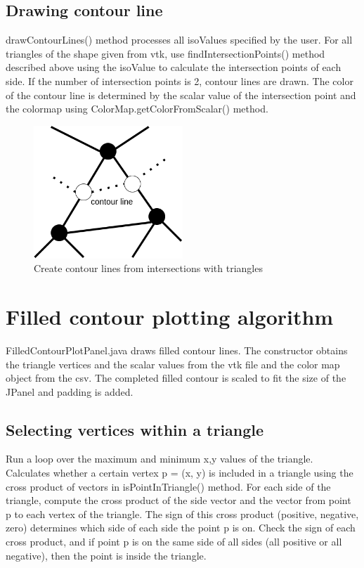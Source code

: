 \documentclass[12pt]{article}
\begin{document}
\subsection{Drawing contour line}
drawContourLines() method processes all isoValues specified by the user. For all triangles of the shape given from vtk, use findIntersectionPoints() method described above using the isoValue to calculate the intersection points of each side. If the number of intersection points is 2, contour lines are drawn. The color of the contour line is determined by the scalar value of the intersection point and the colormap using ColorMap.getColorFromScalar() method.
\begin{figure}[h]
\centering
\includegraphics[width=0.5\textwidth]{contourline.png}
\caption{Create contour lines from intersections with triangles}
\label{fig:my_label}
\end{figure}




\section{Filled contour plotting algorithm}
FilledContourPlotPanel.java draws filled contour lines. The constructor obtains the triangle vertices and the scalar values from the vtk file and the color map object from the csv. The completed filled contour is scaled to fit the size of the JPanel and padding is added.
\subsection{Selecting vertices within a triangle}
Run a loop over the maximum and minimum x,y values of the triangle. Calculates whether a certain vertex p = (x, y) is included in a triangle using the cross product of vectors in isPointInTriangle() method. For each side of the triangle, compute the cross product of the side vector and the vector from point p to each vertex of the triangle. The sign of this cross product (positive, negative, zero) determines which side of each side the point p is on. Check the sign of each cross product, and if point p is on the same side of all sides (all positive or all negative), then the point is inside the triangle.
\end{document}
